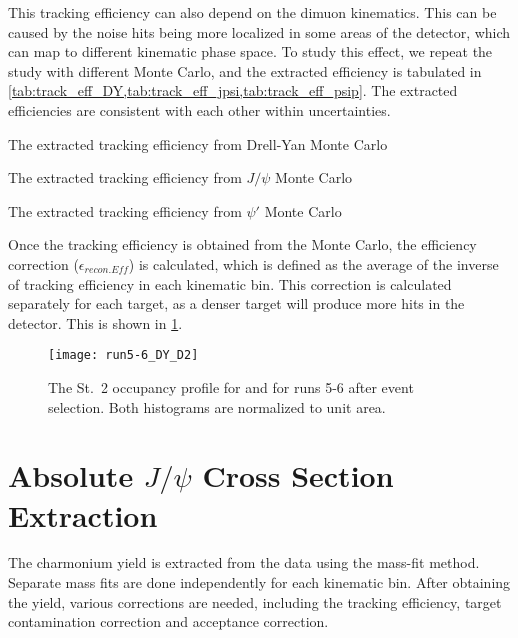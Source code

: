 \documentclass[../main.tex]{subfiles}
\begin{document}
This tracking efficiency can also depend on the dimuon kinematics. This can be caused
by the noise hits being more localized in some areas of the detector, which can map to
different kinematic phase space. To study this effect, we repeat the study with different
Monte Carlo, and the extracted efficiency is tabulated in \cref{tab:track_eff_DY,tab:track_eff_jpsi,tab:track_eff_psip}.
The extracted efficiencies are consistent with each other within uncertainties.

\begin{table}
	\centering
	\caption{The extracted tracking efficiency from Drell-Yan Monte Carlo}
	\label{tab:track_eff_DY}
	
\end{table}
\begin{table}
	\centering
	\caption{The extracted tracking efficiency from $J/\psi$  Monte Carlo}
	\label{tab:track_eff_jpsi}
	
\end{table}
\begin{table}
	\centering
	\caption{The extracted tracking efficiency from $\psi'$ Monte Carlo}
	\label{tab:track_eff_psip}
	
\end{table}

Once the tracking efficiency is obtained from the Monte Carlo, the efficiency correction ($\epsilon_{recon.Eff}$)
is calculated, which is defined as the average of the inverse of tracking efficiency in each
kinematic bin. This correction is calculated separately for each target, as a denser target
will produce more hits in the detector. This is shown in \cref{fig:target_D2}.

\begin{figure}[h!]
	\centering
	\texttt{[image: run5-6\_DY\_D2]}
	\caption{The St.~2 occupancy profile for  and  for runs 5-6 after event selection. Both histograms are normalized to unit area.
	}
	\label{fig:target_D2}
\end{figure}


\section{Absolute \texorpdfstring{$J/\psi$}{J/psi} Cross Section Extraction}
The charmonium yield is extracted from the data using the mass-fit method.
Separate mass fits are done independently for each kinematic bin. After obtaining
the yield, various corrections are needed, including the tracking efficiency, target
contamination correction and acceptance correction.
\end{document}
